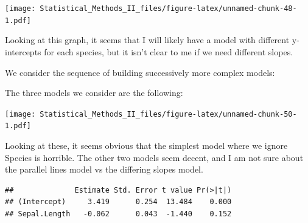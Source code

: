 \documentclass[]{book}
\newenvironment{Shaded}{\begin{snugshade}}{\end{snugshade}}
\newcommand{\KeywordTok}[1]{\textcolor[rgb]{0.13,0.29,0.53}{\textbf{{#1}}}}
\newcommand{\DataTypeTok}[1]{\textcolor[rgb]{0.13,0.29,0.53}{{#1}}}
\newcommand{\DecValTok}[1]{\textcolor[rgb]{0.00,0.00,0.81}{{#1}}}
\newcommand{\StringTok}[1]{\textcolor[rgb]{0.31,0.60,0.02}{{#1}}}
\newcommand{\CommentTok}[1]{\textcolor[rgb]{0.56,0.35,0.01}{\textit{{#1}}}}
\newcommand{\NormalTok}[1]{{#1}}
\theoremstyle{definition}
\theoremstyle{definition}
\theoremstyle{remark}
\begin{document}
\texttt{[image: Statistical\_Methods\_II\_files/figure-latex/unnamed-chunk-48-1.pdf]}

Looking at this graph, it seems that I will likely have a model with
different y-intercepts for each species, but it isn't clear to me if we
need different slopes.

We consider the sequence of building successively more complex models:

\begin{Shaded}
\end{Shaded}

The three models we consider are the following:

\texttt{[image: Statistical\_Methods\_II\_files/figure-latex/unnamed-chunk-50-1.pdf]}

Looking at these, it seems obvious that the simplest model where we
ignore Species is horrible. The other two models seem decent, and I am
not sure about the parallel lines model vs the differing slopes model.

\begin{Shaded}
\end{Shaded}

\begin{verbatim}
##              Estimate Std. Error t value Pr(>|t|)
## (Intercept)     3.419      0.254  13.484    0.000
## Sepal.Length   -0.062      0.043  -1.440    0.152
\end{verbatim}
\end{document}
